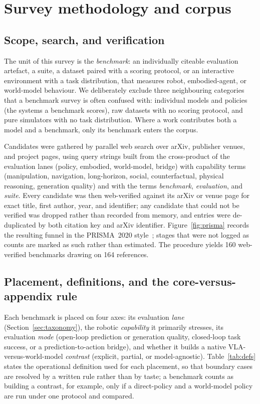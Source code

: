 \section{Survey methodology and corpus}
\label{sec:method}

\subsection{Scope, search, and verification}

The unit of this survey is the \emph{benchmark}: an individually citeable evaluation artefact, a
suite, a dataset paired with a scoring protocol, or an interactive environment with a task
distribution, that measures robot, embodied-agent, or world-model behaviour. We deliberately exclude
three neighbouring categories that a benchmark survey is often confused with: individual models and
policies (the systems a benchmark scores), raw datasets with no scoring protocol, and pure simulators
with no task distribution. Where a work contributes both a model and a benchmark, only its benchmark
enters the corpus.

Candidates were gathered by parallel web search over arXiv, publisher venues, and project pages,
using query strings built from the cross-product of the evaluation lanes (policy, embodied,
world-model, bridge) with capability terms (manipulation, navigation, long-horizon, social,
counterfactual, physical reasoning, generation quality) and with the terms
\emph{benchmark}, \emph{evaluation}, and \emph{suite}. Every candidate was then web-verified against
its arXiv or venue page for exact title, first author, year, and identifier; any candidate that could
not be verified was dropped rather than recorded from memory, and entries were de-duplicated by both
citation key and arXiv identifier. Figure~\ref{fig:prisma} records the resulting funnel in the
PRISMA~2020 style~\cite{prisma2020}; stages that were not logged as counts are marked as such rather
than estimated. The procedure yields 160 web-verified benchmarks drawing on 164 references.



\subsection{Placement, definitions, and the core-versus-appendix rule}

Each benchmark is placed on four axes: its evaluation \emph{lane} (Section~\ref{sec:taxonomy}), the
robotic \emph{capability} it primarily stresses, its evaluation \emph{mode} (open-loop prediction or
generation quality, closed-loop task success, or a prediction-to-action bridge), and whether it
builds a native VLA-versus-world-model \emph{contrast} (explicit, partial, or model-agnostic).
Table~\ref{tab:defs} states the operational definition used for each placement, so that boundary
cases are resolved by a written rule rather than by taste; a benchmark counts as building a contrast,
for example, only if a direct-policy and a world-model policy are run under one protocol and compared.

